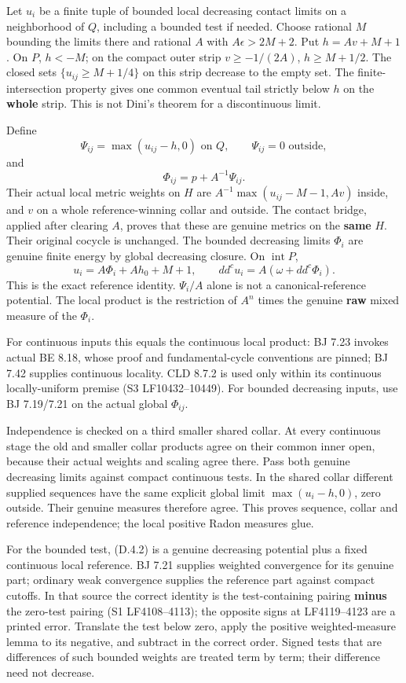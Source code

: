 \documentclass[
  10pt,
]{article}
\begin{document}
Let \(u_i\) be a finite tuple of bounded local decreasing contact limits
on a neighborhood of \(Q\), including a bounded test if needed. Choose
rational \(M\) bounding the limits there and rational \(A\) with
\(A\epsilon>2M+2\). Put \(h=Av+M+1\). On \(P\), \(h<-M\); on the compact
outer strip \(v\ge-1/(2A)\), \(h\ge M+1/2\). The closed sets
\(\{u_{ij}\ge M+1/4\}\) on this strip decrease to the empty set. The
finite-intersection property gives one common eventual tail strictly
below \(h\) on the \textbf{whole} strip. This is not Dini's theorem for
a discontinuous limit.

Define
\[\Psi_{ij}=\max(u_{ij}-h,0)\text{ on }Q,\qquad \Psi_{ij}=0\text{ outside},\]
and \[\Phi_{ij}=p+A^{-1}\Psi_{ij}. \tag{D.4.1}\] Their actual local
metric weights on \(H\) are \(A^{-1}\max(u_{ij}-M-1,Av)\) inside, and
\(v\) on a whole reference-winning collar and outside. The contact
bridge, applied after clearing \(A\), proves that these are genuine
metrics on the \textbf{same} \(H\). Their original cocycle is unchanged.
The bounded decreasing limits \(\Phi_i\) are genuine finite energy by
global decreasing closure. On \(\operatorname{int}P\),
\[u_i=A\Phi_i+Ah_0+M+1,\qquad
dd^c u_i=A(\omega+dd^c\Phi_i). \tag{D.4.2}\] This is the exact reference
identity. \(\Psi_i/A\) alone is not a canonical-reference potential. The
local product is the restriction of \(A^n\) times the genuine
\textbf{raw} mixed measure of the \(\Phi_i\).

For continuous inputs this equals the continuous local product: BJ 7.23
invokes actual BE 8.18, whose proof and fundamental-cycle conventions
are pinned; BJ 7.42 supplies continuous locality. CLD 8.7.2 is used only
within its continuous locally-uniform premise (S3 LF10432--10449). For
bounded decreasing inputs, use BJ 7.19/7.21 on the actual global
\(\Phi_{ij}\).

Independence is checked on a third smaller shared collar. At every
continuous stage the old and smaller collar products agree on their
common inner open, because their actual weights and scaling agree there.
Pass both genuine decreasing limits against compact continuous tests. In
the shared collar different supplied sequences have the same explicit
global limit \(\max(u_i-h,0)\), zero outside. Their genuine measures
therefore agree. This proves sequence, collar and reference
independence; the local positive Radon measures glue.

For the bounded test, (D.4.2) is a genuine decreasing potential plus a
fixed continuous local reference. BJ 7.21 supplies weighted convergence
for its genuine part; ordinary weak convergence supplies the reference
part against compact cutoffs. In that source the correct identity is the
test-containing pairing \textbf{minus} the zero-test pairing (S1
LF4108--4113); the opposite signs at LF4119--4123 are a printed error.
Translate the test below zero, apply the positive weighted-measure lemma
to its negative, and subtract in the correct order. Signed tests that
are differences of such bounded weights are treated term by term; their
difference need not decrease.
\end{document}
